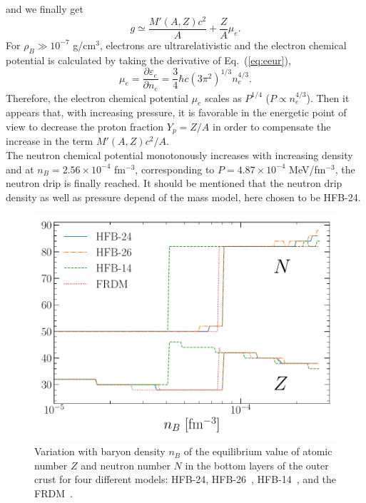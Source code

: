and we finally get
%
\begin{equation}
  g \simeq \frac{M'(A,Z)c^2}{A} + \frac{Z}{A}\mu_e.
\end{equation}
%
For $\rho_B \gg 10^{-7}$ g/cm$^3$, electrons are ultrarelativistic and the
electron chemical potential is calculated by taking the derivative of
Eq.~(\ref{eq:eeur}),
%
\begin{equation}
  \mu_e = \frac{\partial \varepsilon_e}{\partial n_e} =
  \frac{3}{4}\hbar c(3\pi^2)^{1/3}n_e^{4/3}.
\end{equation}
%
Therefore, the electron chemical potential $\mu_e$ scales as $P^{1/4}$ ($P \propto
n_e^{4/3}$). Then it appears that, with increasing pressure, it is favorable
in the energetic point of view to decrease the proton fraction $Y_p = Z/A$ in
order to compensate the increase in the term $M'(A,Z)c^2/A$.\\
The neutron chemical potential monotonously increases with increasing density 
and at $n_B = 2.56\times 10^{-4}$ fm$^{-3}$, corresponding to $P = 4.87\times
10^{-4}$ MeV/fm$^{-3}$, the neutron drip is finally
reached. It should be mentioned that the neutron drip density as well as
pressure depend of the mass model, here chosen to be HFB-24.

\begin{figure}[htbp]
\begin{center}
  \includegraphics[width=0.8\linewidth]{figures/ocrust_model.pdf}
\end{center}
\caption[Ground-state composition versus baryon density in the 
outer crust]{Variation with baryon density $n_B$ of the equilibrium value of 
  atomic number $Z$ and neutron number $N$ in the bottom layers of the outer 
  crust for four different models: HFB-24, HFB-26~\cite{Goriely2013}, 
  HFB-14~\cite{Goriely2007}, and the FRDM~\cite{Moller1995}.}\label{fig:ocrust_model}
\end{figure}

